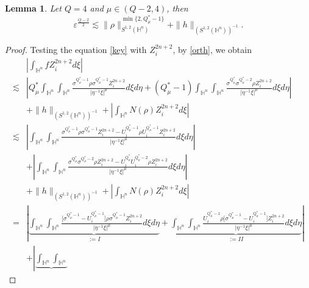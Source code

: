 \documentclass[11pt]{article}
\newtheorem{lemma}{Lemma}[section]
\begin{document}
\begin{lemma}\label{main4}
Let $Q=4$ and $\mu\in (Q-2,4)$, then
\begin{equation*}
     \varepsilon^{\frac{Q-2}{2}} \lesssim  \|\rho\|_{S^{1,2}(\mathbb{H}^{n})}^{\min\{2,Q_\mu^*-1\}}%
     +\|h\|_{(S^{1,2}(\mathbb{H}^{n}))^{-1}}.
   \end{equation*}
\end{lemma}
\begin{proof}
Testing the equation \eqref{key} with $Z_i^{2n+2}$, by \eqref{orth}, we obtain
\begin{align}\label{main40}
&\left| \int_{\mathbb{H}^n} f Z_i^{2n+2} d\xi\right| \nonumber\\
\lesssim & \left|Q^{\ast}_{\mu}\int_{\mathbb{H}^{n}}\int_{\mathbb{H}^{n}}
\frac{\sigma^{Q^{\ast}_{\mu}-1}\rho \sigma^{Q^{\ast}_{\mu}-1} Z_i^{2n+2}}
{|\eta^{-1}\xi|^{\mu}} d\xi{d}\eta+(Q^{\ast}_{\mu}-1)
\int_{\mathbb{H}^{n}}\int_{\mathbb{H}^{n}}\frac{\sigma^{Q^{\ast}_{\mu}}
\sigma^{Q^{\ast}_{\mu}-2}\rho Z_i^{2n+2}}{|\eta^{-1}\xi|^{\mu}}{d}\xi d\eta
\right|
\nonumber\\&
+ \|h\|_{(S^{1,2}(\mathbb{H}^{n}))^{-1}}
+ \left|\int_{\mathbb{H}^n} N(\rho) Z_i^{2n+2}  d\xi \right| \nonumber\\
\lesssim&\left|{\int_{\mathbb{H}^{n}}\int_{\mathbb{H}^{n}}
\frac{\sigma^{Q^{\ast}_{\mu}-1}\rho \sigma^{Q^{\ast}_{\mu}-1} Z_i^{2n+2}-U_i^{Q^{\ast}_{\mu}-1}\rho U_i^{Q^{\ast}_{\mu}-1} Z_i^{2n+2}}
{|\eta^{-1}\xi|^{\mu}} d\xi{d}\eta}\right| \nonumber\\
&+\left|{
\int_{\mathbb{H}^{n}}\int_{\mathbb{H}^{n}}\frac{\sigma^{Q^{\ast}_{\mu}}
\sigma^{Q^{\ast}_{\mu}-2}\rho Z_i^{2n+2}-U_i^{Q^{\ast}_{\mu}}
U_i^{Q^{\ast}_{\mu}-2}\rho Z_i^{2n+2}}{|\eta^{-1}\xi|^{\mu}}{d}\xi d\eta
}\right|
\nonumber\\&
+ \|h\|_{(S^{1,2}(\mathbb{H}^{n}))^{-1}}
+ {\left|\int_{\mathbb{H}^n} N(\rho) Z_i^{2n+2}  d\xi \right|} \nonumber\\
=&\left|\underbrace{\int_{\mathbb{H}^{n}}\int_{\mathbb{H}^{n}}
\frac{\Big[\sigma^{Q^{\ast}_{\mu}-1}-U_i^{Q^{\ast}_{\mu}-1}\Big]\rho \sigma^{Q^{\ast}_{\mu}-1} Z_i^{2n+2}}
{|\eta^{-1}\xi|^{\mu}} d\xi{d}\eta}_{:=I}+\underbrace{\int_{\mathbb{H}^{n}}\int_{\mathbb{H}^{n}}
\frac{U_i^{Q^{\ast}_{\mu}-1}\rho \Big[\sigma^{Q^{\ast}_{\mu}-1}-U_i^{Q^{\ast}_{\mu}-1}\Big] Z_i^{2n+2}}
{|\eta^{-1}\xi|^{\mu}} d\xi{d}\eta}_{:=II}\right|\nonumber\\
&+\left|\underbrace{\int_{\mathbb{H}^{n}}\int_{\mathbb{H}^{n}}
}
\end{align}
\end{proof}
\end{document}
